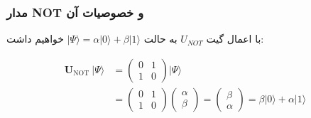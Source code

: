 \documentclass{book}
\begin{document}
\subsubsection{مدار NOT و خصوصیات آن}
با اعمال گیت $U_{NOT}$ به حالت $\vert \Psi \rangle = \alpha \vert 0 \rangle + \beta \vert 1\rangle$ خواهیم داشت:
 
\begin{center}
$$	\begin{aligned}
		\boldsymbol{U}_{\text {NOT }}|\Psi\rangle & =\left(\begin{array}{ll}
			0 & 1 \\
			1 & 0
		\end{array}\right)|\Psi\rangle \\
		& =\left(\begin{array}{ll}
			0 & 1 \\
			1 & 0
		\end{array}\right)\left(\begin{array}{l}
			\alpha \\
			\beta
		\end{array}\right)=\left(\begin{array}{l}
			\beta \\
			\alpha
		\end{array}\right)=\beta|0\rangle+\alpha|1\rangle
	\end{aligned}$$
\end{center}
\end{document}
